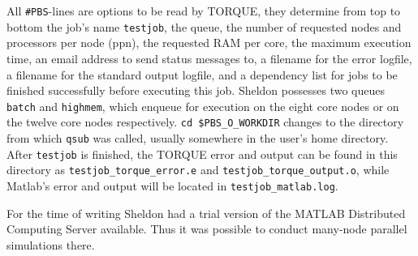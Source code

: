 \documentclass[11.5pt,a4paper]{article}
\begin{document}
All \verb$#PBS$-lines are options to be read by TORQUE, they determine from top to bottom the job's name \verb$testjob$, the queue, the number of requested nodes and processors per node (ppn), the requested RAM per core, the maximum execution time, an email address to send status messages to, a filename for the error logfile, a filename for the standard output logfile, and a dependency list for jobs to be finished successfully before executing this job. Sheldon possesses two queues \verb$batch$ and \verb$highmem$, which enqueue for execution on the eight core nodes or on the twelve core nodes respectively. \verb#cd $PBS_O_WORKDIR# changes to the directory from which \verb$qsub$ was called, usually somewhere in the user's home directory. After \verb$testjob$ is finished, the TORQUE error and output can be found in this directory as \verb$testjob_torque_error.e$ and \verb$testjob_torque_output.o$, while Matlab's error and output will be located in \verb$testjob_matlab.log$.

For the time of writing Sheldon had a trial version of the MATLAB Distributed Computing Server available. Thus it was possible to conduct many-node parallel simulations there.
\end{document}
